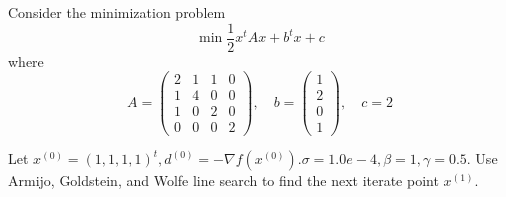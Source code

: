 

\newcommand\Title{最优化方法第7次作业}


\begin{problem}
    Consider the minimization problem
    \[\min \frac{1}{2}x^tAx + b^tx + c\]
    where \[A = \begin{pmatrix}
        2 & 1 & 1 & 0\\
        1 & 4 & 0 & 0\\
        1 & 0 & 2 & 0\\
        0 & 0 & 0 & 2 
    \end{pmatrix}, \quad b = \begin{pmatrix}
        1 \\ 2 \\ 0 \\ 1
    \end{pmatrix}, \quad c = 2\]
    
    Let $x^{(0)} = (1, 1, 1, 1)^t, d^{(0)} = -\nabla f(x^{(0)})$.$\sigma = 1.0e-4, \beta = 1, \gamma = 0.5$. Use Armijo, Goldstein, and Wolfe line search to find the next iterate point $x^{(1)}$.


\end{problem}
